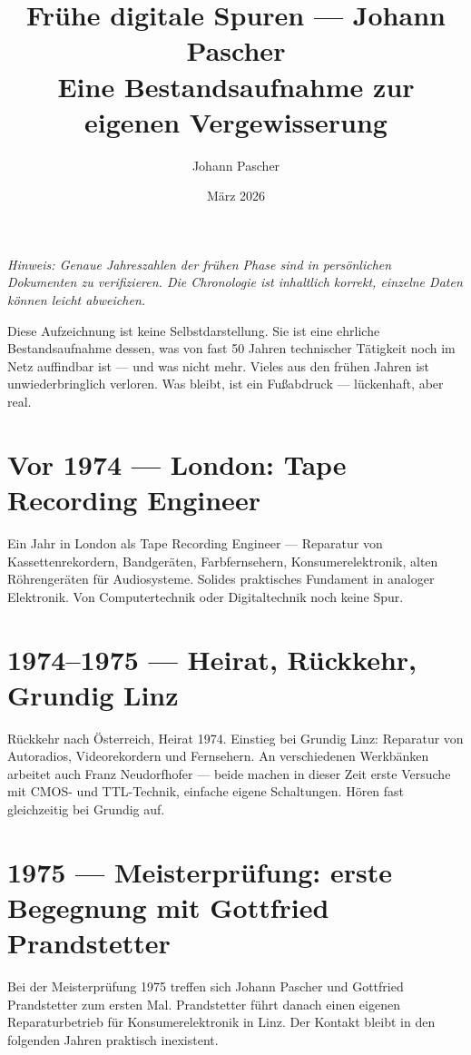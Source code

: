 \documentclass[a4paper,12pt]{article}
\title{\textbf{Frühe digitale Spuren --- Johann Pascher}\\
\large Eine Bestandsaufnahme zur eigenen Vergewisserung}
\author{Johann Pascher}
\date{März 2026}
\begin{document}
\maketitle

\textit{Hinweis: Genaue Jahreszahlen der frühen Phase sind in persönlichen Dokumenten zu verifizieren. Die Chronologie ist inhaltlich korrekt, einzelne Daten können leicht abweichen.}

\bigskip

Diese Aufzeichnung ist keine Selbstdarstellung. Sie ist eine ehrliche Bestandsaufnahme dessen, was von fast 50 Jahren technischer Tätigkeit noch im Netz auffindbar ist --- und was nicht mehr. Vieles aus den frühen Jahren ist unwiederbringlich verloren. Was bleibt, ist ein Fußabdruck --- lückenhaft, aber real.

\section{Vor 1974 --- London: Tape Recording Engineer}

Ein Jahr in London als Tape Recording Engineer --- Reparatur von Kassettenrekordern, Bandgeräten, Farbfernsehern, Konsumerelektronik, alten Röhrengeräten für Audiosysteme. Solides praktisches Fundament in analoger Elektronik. Von Computertechnik oder Digitaltechnik noch keine Spur.

\section{1974--1975 --- Heirat, Rückkehr, Grundig Linz}

Rückkehr nach Österreich, Heirat 1974. Einstieg bei Grundig Linz: Reparatur von Autoradios, Videorekordern und Fernsehern. An verschiedenen Werkbänken arbeitet auch Franz Neudorfhofer --- beide machen in dieser Zeit erste Versuche mit CMOS- und TTL-Technik, einfache eigene Schaltungen. Hören fast gleichzeitig bei Grundig auf.

\section{1975 --- Meisterprüfung: erste Begegnung mit Gottfried Prandstetter}

Bei der Meisterprüfung 1975 treffen sich Johann Pascher und Gottfried Prandstetter zum ersten Mal. Prandstetter führt danach einen eigenen Reparaturbetrieb für Konsumerelektronik in Linz. Der Kontakt bleibt in den folgenden Jahren praktisch inexistent.
\end{document}
